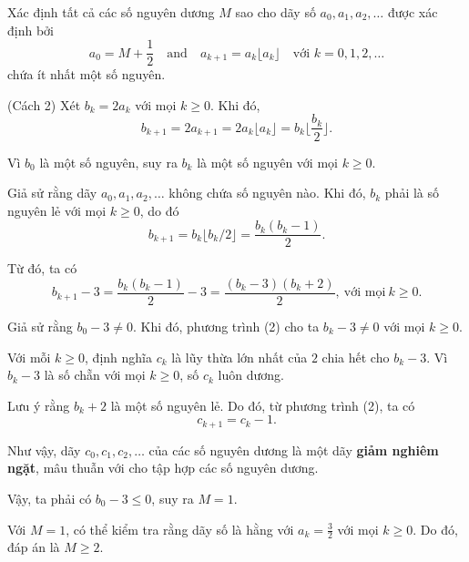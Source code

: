 \documentclass[../03-arithmetic-functions.tex]{subfiles}
\begin{document}
\begin{example*}
    Xác định tất cả các số nguyên dương \( M \) sao cho dãy số \( a_0, a_1, a_2, \dots \) được xác định bởi  
    \[
        a_0 = M + \frac{1}{2}\quad \text{and}\quad a_{k+1} = a_k \lfloor a_k \rfloor \quad \text{với } k = 0, 1, 2, \dots
    \]
    chứa ít nhất một số nguyên.
\end{example*}

\begin{soln}\footnotemark(Cách 2)
    Xét \( b_k = 2a_k \) với mọi \( k \geq 0 \). Khi đó,    
    \[
        b_{k+1} = 2a_{k+1} = 2a_k \lfloor a_k \rfloor = b_k \lfloor \frac{b_k}{2} \rfloor.
    \]
    
    Vì \( b_0 \) là một số nguyên, suy ra \( b_k \) là một số nguyên với mọi \( k \geq 0 \).  
    
    Giả sử rằng dãy \( a_0, a_1, a_2, \dots \) không chứa số nguyên nào. Khi đó, \( b_k \) phải là số nguyên lẻ với mọi \( k \geq 0 \), do đó  
    \[
        b_{k+1} = b_k \lfloor b_k / 2 \rfloor = \frac{b_k (b_k - 1)}{2}. \tag{1}
    \]
    
    Từ đó, ta có  
    \[
        b_{k+1} - 3 = \frac{b_k (b_k - 1)}{2} - 3 = \frac{(b_k - 3)(b_k + 2)}{2},\ \text{với mọi}\ k \geq 0. \tag{2} 
    \]
    
    Giả sử rằng \( b_0 - 3 \neq 0 \). Khi đó, phương trình (2) cho ta \( b_k - 3 \neq 0 \) với mọi \( k \geq 0 \).
    
    Với mỗi \( k \geq 0 \), định nghĩa \( c_k \) là lũy thừa lớn nhất của \( 2 \) chia hết cho \( b_k - 3 \).
    Vì \( b_k - 3 \) là số chẵn với mọi \( k \geq 0 \), số \( c_k \) luôn dương.  
    
    Lưu ý rằng \( b_k + 2 \) là một số nguyên lẻ. Do đó, từ phương trình (2), ta có  
    \[
        c_{k+1} = c_k - 1.
    \]
    
    Như vậy, dãy \( c_0, c_1, c_2, \dots \) của các số nguyên dương là một dãy \label{definition:monotonic-sequence} \textbf{giảm nghiêm ngặt}, 
    mâu thuẫn với  cho tập hợp các số nguyên dương.

    Vậy, ta phải có \( b_0 - 3 \leq 0 \), suy ra \( M = 1 \).  
    
    Với \( M = 1 \), có thể kiểm tra rằng dãy số là hằng với \( a_k = \frac{3}{2} \) với mọi \( k \geq 0 \). Do đó, đáp án là \( M \geq 2 \).  
\end{soln}

\end{document}
